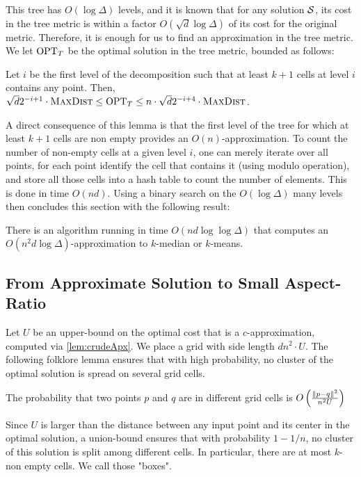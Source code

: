 This tree has $O(\log \Delta)$ levels, and it is known that for any solution $\mathcal S$, its cost in the tree metric is within a factor $O(\sqrt d \log \Delta)$ of its cost for the original metric. Therefore, it is enough for us to find an approximation in the tree metric. We let $\text{OPT}_T$ be the optimal solution in the tree metric, bounded as follows:
 
\begin{lemma}\label{lem:apxTree}
Let $i$ be the first level of the decomposition such that at least $k+1$ cells at level $i$ contains any point. Then, $\sqrt{d}2^{-i+1} \cdot \textsc{MaxDist} \leq \text{OPT}_T \leq n \cdot \sqrt{d}2^{-i+4} \cdot \textsc{MaxDist}$.
\end{lemma}

A direct consequence of this lemma is that the first level of the tree for which at least $k+1$ cells are non empty provides an $O(n)$-approximation. 
To count the number of non-empty cells at a given level $i$, one can merely iterate over all points, for each point identify the cell that contains it (using modulo operation), and store all those cells into a hash table to count the number of elements. This is done in time $O(nd)$.
Using a binary search on the $O(\log \Delta)$ many levels then concludes this section with the following result:

\begin{lemma}\label{lem:crudeApx}
There is an algorithm running in time $O(nd \log \log \Delta)$ that computes an  $O(n^2 d \log \Delta)$-approximation to $k$-median or $k$-means.
\end{lemma}

\subsection{From Approximate Solution to Small Aspect-Ratio}
Let $U$ be an upper-bound on the optimal cost that is a $c$-approximation, computed via \cref{lem:crudeApx}. We place a grid with side length $d n^2\cdot U$.
The following folklore lemma ensures that with high probability, no cluster of the optimal solution is spread on several grid cells.

\begin{lemma}
The probability that two points $p$ and $q$ are in different grid cells is $O\left( \frac{\|p-q\|^2}{n^2 U}\right)$
\end{lemma}
Since $U$ is larger than the distance between any input point and its center in the optimal solution, a union-bound ensures that with probability $1-1/n$, no cluster of this solution is split among different cells.
In particular, there are at most $k$-non empty cells. We call those "boxes".

